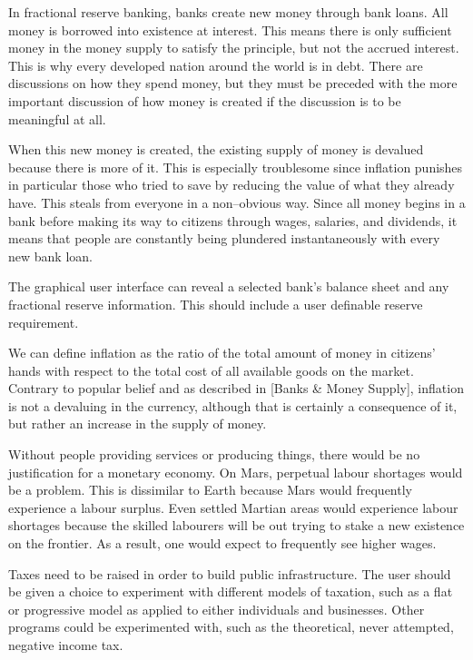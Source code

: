 In fractional reserve banking, banks create new money through bank loans. All money is borrowed into existence at interest. This means there is only sufficient money in the money supply to satisfy the principle, but not the accrued interest. This is why every developed nation around the world is in debt. There are discussions on how they spend money, but they must be preceded with the more important discussion of how money is created if the discussion is to be meaningful at all.

When this new money is created, the existing supply of money is devalued because there is more of it. This is especially troublesome since inflation punishes in particular those who tried to save by reducing the value of what they already have. This steals from everyone in a non--obvious way. Since all money begins in a bank before making its way to citizens through wages, salaries, and dividends, it means that people are constantly being plundered instantaneously with every new bank loan.

The graphical user interface can reveal a selected bank's balance sheet and any fractional reserve information. This should include a user definable reserve requirement.

We can define inflation as the ratio of the total amount of money in citizens' hands with respect to the total cost of all available goods on the market. Contrary to popular belief and as described in [Banks & Money Supply], inflation is not a devaluing in the currency, although that is certainly a consequence of it, but rather an increase in the supply of money. 

Without people providing services or producing things, there would be no justification for a monetary economy. On Mars, perpetual labour shortages would be a problem. This is dissimilar to Earth because Mars would frequently experience a labour surplus. Even settled Martian areas would experience labour shortages because the skilled labourers will be out trying to stake a new existence on the frontier. As a result, one would expect to frequently see higher wages.

Taxes need to be raised in order to build public infrastructure. The user should be given a choice to experiment with different models of taxation, such as a flat or progressive model as applied to either individuals and businesses. Other programs could be experimented with, such as the theoretical, never attempted, negative income tax.

